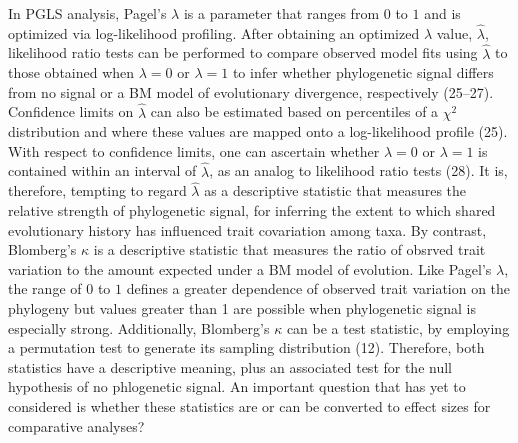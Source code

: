 \documentclass[]{article}
\begin{document}
In PGLS analysis, Pagel's \(\lambda\) is a parameter that ranges from
\(0\) to \(1\) and is optimized via log-likelihood profiling. After
obtaining an optimized \(\lambda\) value, \(\hat{\lambda}\), likelihood
ratio tests can be performed to compare observed model fits using
\(\hat{\lambda}\) to those obtained when \(\lambda=0\) or \(\lambda=1\)
to infer whether phylogenetic signal differs from no signal or a BM
model of evolutionary divergence, respectively (25--27). Confidence
limits on \(\hat{\lambda}\) can also be estimated based on percentiles
of a \(\chi^2\) distribution and where these values are mapped onto a
log-likelihood profile (25). With respect to confidence limits, one can
ascertain whether \(\lambda=0\) or \(\lambda=1\) is contained within an
interval of \(\hat{\lambda}\), as an analog to likelihood ratio tests
(28). It is, therefore, tempting to regard \(\hat{\lambda}\) as a
descriptive statistic that measures the relative strength of
phylogenetic signal, for inferring the extent to which shared
evolutionary history has influenced trait covariation among taxa. By
contrast, Blomberg's \(\kappa\) is a descriptive statistic that measures
the ratio of obsrved trait variation to the amount expected under a BM
model of evolution. Like Pagel's \(\lambda\), the range of \(0\) to
\(1\) defines a greater dependence of observed trait variation on the
phylogeny but values greater than 1 are possible when phylogenetic
signal is especially strong. Additionally, Blomberg's \(\kappa\) can be
a test statistic, by employing a permutation test to generate its
sampling distribution (12). Therefore, both statistics have a
descriptive meaning, plus an associated test for the null hypothesis of
no phlogenetic signal. An important question that has yet to considered
is whether these statistics are or can be converted to effect sizes for
comparative analyses? \hfill\break 
\end{document}
